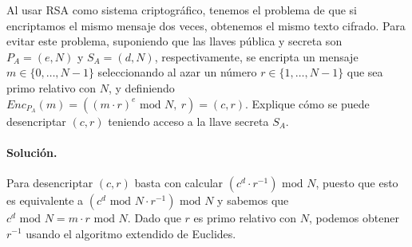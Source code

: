 Al usar RSA como sistema criptográfico, tenemos el problema de que si
encriptamos el mismo mensaje dos veces, obtenemos el mismo texto
cifrado. Para evitar este problema, suponiendo que las llaves pública
y secreta son $P_A=(e, N)$ y $S_A=(d, N)$, respectivamente, se
encripta un mensaje $m \in \{0, \ldots, N-1\}$ seleccionando al azar un número
$r \in \{1, \ldots, N-1\}$ que sea primo relativo con $N$, y
definiendo $\textit{Enc}_{P_A}(m) = ((m \cdot r)^e \text{ mod } N,\
r) = (c,r)$. Explique cómo se puede desencriptar $(c,r)$ teniendo acceso a
la llave secreta $S_A$.

\paragraph{Solución.} Para desencriptar $(c,r)$ basta con calcular $(c^d\cdot r^{-1}) \text{ mod } N$, puesto que esto es equivalente a $(c^d\text{ mod } N\cdot r^{-1}) \text{ mod } N$ y sabemos que $c^d\text{ mod } N=m\cdot r \text{ mod }N$. Dado que $r$ es primo relativo con $N$, podemos obtener $r^{-1}$ usando el algoritmo extendido de Euclides.
